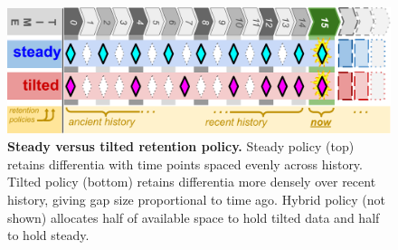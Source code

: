 \begin{figure}
  \centering
  \includegraphics[width=\linewidth]{img/steady-vs-tilted-schematic}
  \caption{%
  \textbf{Steady versus tilted retention policy.}
  Steady policy (top) retains differentia with time points spaced evenly across history.
  Tilted policy (bottom) retains differentia more densely over recent history, giving gap size proportional to time ago.
  Hybrid policy (not shown) allocates half of available space to hold tilted data and half to hold steady.
  }
  \label{fig:steady-vs-tilted-schematic}
\end{figure}
